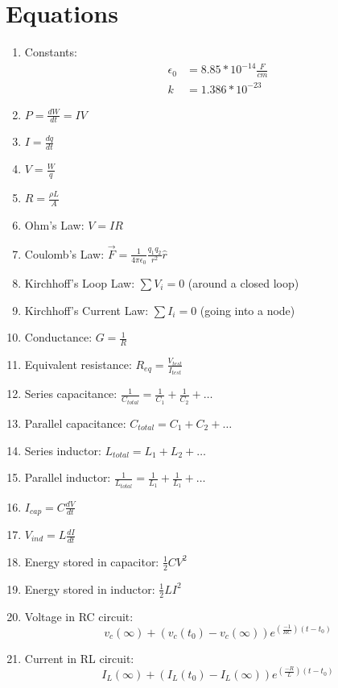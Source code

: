 \documentclass[twocolumn]{article}
\begin{document}
\section*{Equations}
\pagestyle{empty}

\begin{enumerate}
    \item Constants:
    \begin{align*}
        \epsilon_0&=8.85*10^{-14} \frac{F}{cm} \\
        k&=1.386*10^{-23}
    \end{align*}
    \item $P = \frac{dW}{dt} = IV$
    \item $I = \frac{dq}{dt}$
    \item $V = \frac{W}{q}$
    \item $R = \frac{\rho L}{A}$
    \item Ohm's Law: $V=IR$
    \item Coulomb's Law: $\vec{F} = \frac{1}{4\pi \epsilon_0}\frac{q_1 q_2}{r^2}\hat{r}$
    \item Kirchhoff's Loop Law: $\sum V_i = 0$ (around a closed loop)
    \item Kirchhoff's Current Law: $\sum I_i = 0$ (going into a node)
    \item Conductance: $G = \frac{1}{R}$
    \item Equivalent resistance: $R_{eq} = \frac{V_{test}}{I_{test}}$
    \item Series capacitance: $\frac{1}{C_{total}} = \frac{1}{C_1} + \frac{1}{C_2} + \dots$
    \item Parallel capacitance: $C_{total} = C_1 + C_2 + \dots$
    \item Series inductor: $L_{total} = L_1+L_2+\dots$
    \item Parallel inductor: $\frac{1}{L_{total}} = \frac{1}{L_1} + \frac{1}{L_1} + \dots$
    \item $I_{cap} = C \frac{dV}{dt}$
    \item $V_{ind} = L \frac{dI}{dt}$
    \item Energy stored in capacitor: $\frac{1}{2}CV^2$
    \item Energy stored in inductor: $\frac{1}{2}LI^2$
    \item Voltage in RC circuit: 
    \[v_c(\infty) +\left(v_c(t_0) - v_c(\infty)\right)e^{(\frac{-1}{RC})(t - t_0)}\]
    \item Current in RL circuit: 
    \[I_L(\infty) +\left(I_L(t_0) - I_L(\infty)\right)e^{(\frac{-R}{L})(t - t_0)}\]

\end{enumerate}
\end{document}
